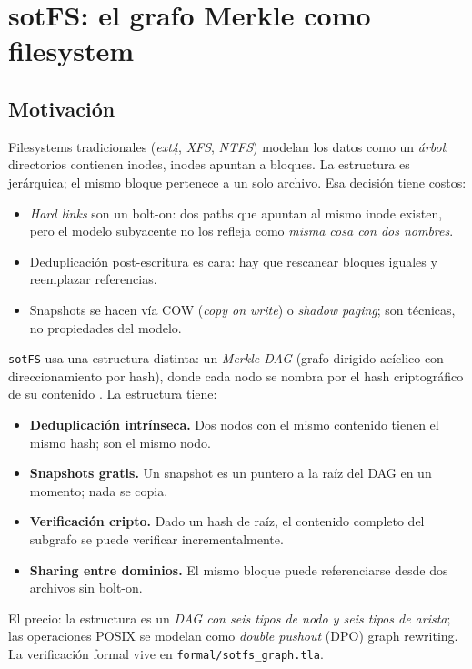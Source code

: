 \chapter{sotFS: el grafo Merkle como filesystem}
\label{cap:sotfs-modelo}

\section{Motivación}

Filesystems tradicionales (\emph{ext4}, \emph{XFS}, \emph{NTFS})
modelan los datos como un \emph{árbol}: directorios contienen
inodes, inodes apuntan a bloques. La estructura es jerárquica;
el mismo bloque pertenece a un solo archivo. Esa decisión tiene
costos:

\begin{itemize}
  \item \emph{Hard links} son un bolt-on: dos paths que apuntan
    al mismo inode existen, pero el modelo subyacente no los
    refleja como \emph{misma cosa con dos nombres}.
  \item Deduplicación post-escritura es cara: hay que rescanear
    bloques iguales y reemplazar referencias.
  \item Snapshots se hacen vía COW (\emph{copy on write}) o
    \emph{shadow paging}; son técnicas, no propiedades del
    modelo.
\end{itemize}

\texttt{sotFS} usa una estructura distinta: un \emph{Merkle DAG}
(grafo dirigido acíclico con direccionamiento por hash), donde
cada nodo se nombra por el hash criptográfico de su contenido
\cite{Merkle1987-DAG}. La estructura tiene:

\begin{itemize}
  \item \textbf{Deduplicación intrínseca.} Dos nodos con el mismo
    contenido tienen el mismo hash; son el mismo nodo.
  \item \textbf{Snapshots gratis.} Un snapshot es un puntero a
    la raíz del DAG en un momento; nada se copia.
  \item \textbf{Verificación cripto.} Dado un hash de raíz, el
    contenido completo del subgrafo se puede verificar
    incrementalmente.
  \item \textbf{Sharing entre dominios.} El mismo bloque puede
    referenciarse desde dos archivos sin bolt-on.
\end{itemize}

El precio: la estructura es un \emph{DAG con seis tipos de
nodo y seis tipos de arista}; las operaciones POSIX se modelan
como \emph{double pushout} (DPO) graph rewriting. La
verificación formal vive en \texttt{formal/sotfs\_graph.tla}.

